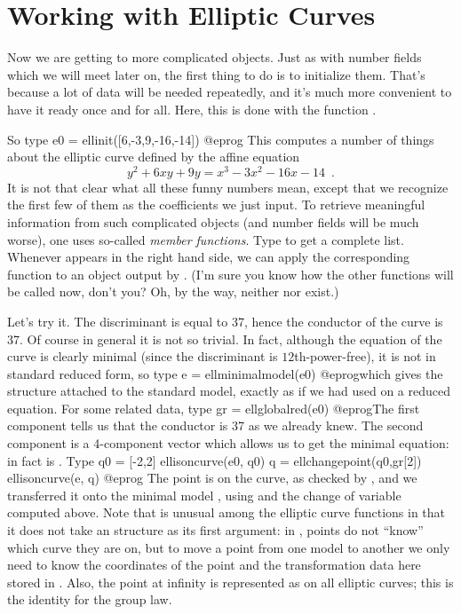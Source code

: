 \section{Working with Elliptic Curves}

Now we are getting to more complicated objects. Just as with number fields
which we will meet later on, the first thing to do is to initialize them.
That's because a lot of data will be needed repeatedly, and it's much more
convenient to have it ready once and for all. Here, this is done with the
function .

So type
\bprog
  e0 = ellinit([6,-3,9,-16,-14])
@eprog
This computes a number of things
about the elliptic curve defined by the affine equation
%
$$ y^2+6xy+9y = x^3-3x^2-16x-14\enspace. $$
%
It is not that clear what all these funny numbers mean, except that we
recognize the first few of them as the coefficients we just input. To
retrieve meaningful information from such complicated objects (and number
fields will be much worse), one uses so-called \emph{member
functions}. Type  to get a complete list. Whenever  appears
in the right hand side, we can apply the corresponding function to an object
output by . (I'm sure you know how the other  functions
will be called now, don't you? Oh, by the way, neither  nor
 exist.)

  Let's try it. The discriminant  is equal to 37, hence
the conductor of the curve is 37. Of course in general it is not so
trivial. In fact, although the equation of the curve is clearly
minimal (since the discriminant is $12$th-power-free), it is not in
standard reduced form, so type
\bprog
  e = ellminimalmodel(e0)
@eprog\noindent which
gives the  structure attached to the standard model,
exactly as if we had used  on a reduced equation. For
some related data, type
\bprog
  gr = ellglobalred(e0)
@eprog\noindent The first
component  tells us that the conductor is 37 as we already
knew.  The second component is a 4-component vector which allows us to
get the minimal equation: in fact  is .
Type
\bprog
  q0 = [-2,2]
  ellisoncurve(e0, q0)
  q = ellchangepoint(q0,gr[2])
  ellisoncurve(e, q)
@eprog\noindent
The point  is on the curve, as checked by , and we
transferred it onto the minimal model , using  and
the change of variable computed above. Note that  is
unusual among the elliptic curve functions in that it does not take an
 structure as its first argument: in , points do not
``know'' which curve they are on, but to move a point from one model to
another we only need to know the coordinates of the point and the
transformation data here stored in .  Also, the point at infinity
is represented as \kbd{[0]} on all elliptic curves; this is the identity for
the group law.

